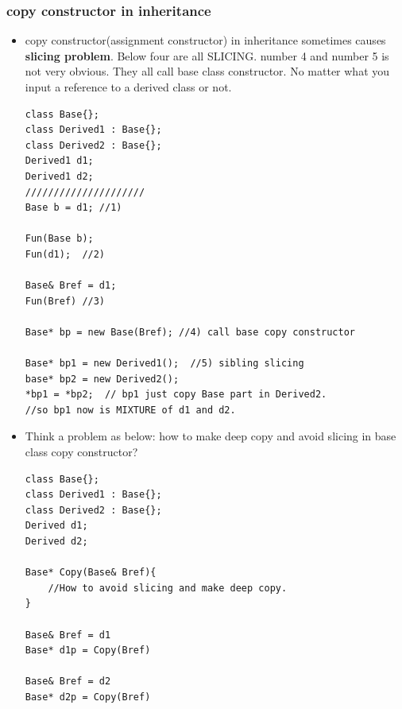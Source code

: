 \documentclass[a4paper,11pt,twoside]{book}
\begin{document}
\subsubsection{copy constructor in inheritance}

\begin{itemize}
	\item copy constructor(assignment constructor) in inheritance sometimes causes \textbf{slicing problem}.   Below four are all SLICING.  number 4 and number 5 is not very obvious. They all call base class constructor.  No matter what you input a reference to a derived class or not.
\begin{lstlisting}[numbers=none]
class Base{};
class Derived1 : Base{};
class Derived2 : Base{};
Derived1 d1;
Derived1 d2;
/////////////////////
Base b = d1; //1)
	
Fun(Base b);
Fun(d1);  //2)
	
Base& Bref = d1;
Fun(Bref) //3)
	
Base* bp = new Base(Bref); //4) call base copy constructor
	
Base* bp1 = new Derived1();  //5) sibling slicing
base* bp2 = new Derived2();
*bp1 = *bp2;  // bp1 just copy Base part in Derived2.
//so bp1 now is MIXTURE of d1 and d2.
\end{lstlisting}

	
	
\item Think a problem as below: how to make deep copy and avoid slicing in base class copy constructor?
\begin{lstlisting}[numbers=none]
class Base{};
class Derived1 : Base{};
class Derived2 : Base{};
Derived d1;
Derived d2;
	
Base* Copy(Base& Bref){
	//How to avoid slicing and make deep copy.
}
	
Base& Bref = d1
Base* d1p = Copy(Bref)

Base& Bref = d2
Base* d2p = Copy(Bref)
	\end{lstlisting}
	

\end{itemize}
\end{document}

